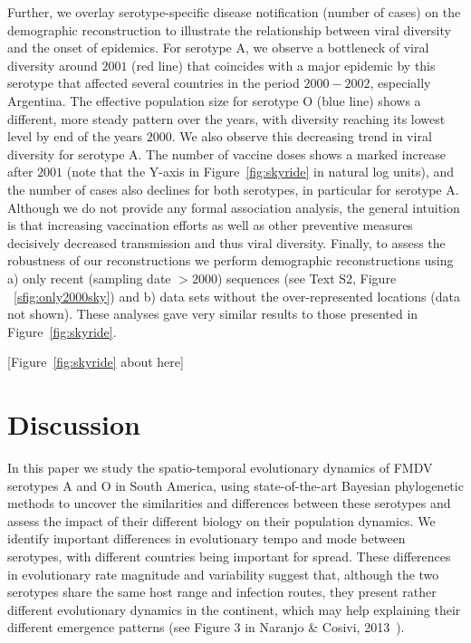 \documentclass[10pt]{article}
\begin{document}
Further, we overlay serotype-specific disease notification (number of cases) on the demographic reconstruction to illustrate the relationship between viral diversity and the onset of epidemics. 
For serotype A, we observe a bottleneck of viral diversity around $2001$ (red line) that coincides with a major epidemic by this serotype that affected several countries in the period $2000-2002$, especially Argentina.
The effective population size for serotype O (blue line) shows a different, more steady pattern over the years, with diversity reaching its lowest level by end of the years $2000$.
We also observe this decreasing trend in viral diversity for serotype A.
The number of vaccine doses shows a marked increase after $2001$ (note that the Y-axis in Figure~\ref{fig:skyride} in natural log units), and the number of cases also declines for both serotypes, in particular for serotype A.
Although we do not provide any formal association analysis, the general intuition is that increasing vaccination efforts as well as other preventive measures decisively decreased transmission and thus viral diversity.
Finally, to assess the robustness of our reconstructions we perform demographic reconstructions using a) only recent (sampling date $>2000$) sequences (see Text S2, Figure ~\ref{sfig:only2000sky}) and b) data sets without the over-represented locations (data not shown).
These analyses gave very similar results to those presented in Figure~\ref{fig:skyride}.

\begin{center}
 [Figure~\ref{fig:skyride} about here]
\end{center}


\section*{Discussion}

In this paper we study the spatio-temporal evolutionary dynamics of FMDV serotypes A and O in South America, using state-of-the-art Bayesian phylogenetic methods to uncover the similarities and differences between these serotypes and assess the impact of their different biology on their population dynamics.
We identify important differences in evolutionary tempo and mode between serotypes, with different countries being important for spread.
These differences in evolutionary rate magnitude and variability suggest that, although the two serotypes share the same host range and infection routes, they present rather different evolutionary dynamics in the continent, which may help explaining their different emergence patterns (see Figure 3 in Naranjo \& Cosivi, 2013~\cite{Naranjo2013}). 
\end{document}
